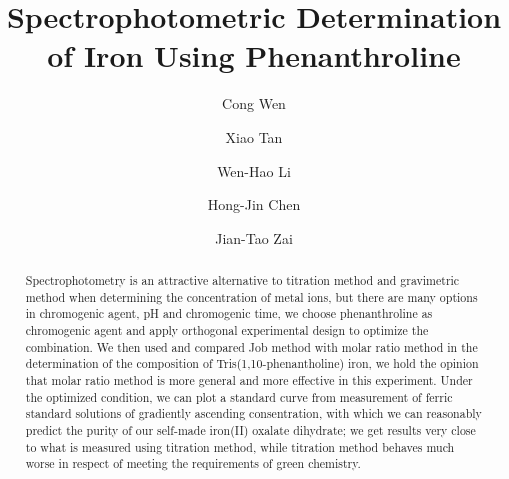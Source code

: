 \documentclass[journal=jacsat,manuscript=article]{achemso}
\author{Cong Wen}
\author{Xiao Tan}
\author{Wen-Hao Li}
\author{Hong-Jin Chen}
\author{Jian-Tao Zai}
\affiliation[SJTU]
    {School of Chemistry and Chemical Engineering, Shanghai Jiao Tong University, Shanghai 200240, P. R. China}
\title{Spectrophotometric Determination of Iron Using Phenanthroline}
\begin{document}

\begin{abstract}

\textsf{Spectrophotometry} is an attractive alternative to titration method and gravimetric method when determining the concentration of metal ions, but there are many options in chromogenic agent, pH and chromogenic time, we choose phenanthroline as chromogenic agent and apply \textsf{orthogonal experimental design} to optimize the combination. We then used and compared \textsf{Job method} with \textsf{molar ratio method} in the determination of the composition of Tris(1,10-phenantholine) iron, we hold the opinion that molar ratio method is more general and more effective in this experiment. Under the optimized condition, we can plot a standard curve from measurement of ferric standard solutions of gradiently ascending consentration, with which we can reasonably predict the purity of our self-made iron(II) oxalate dihydrate; we get results very close to what is measured using titration method, while titration method behaves much worse in respect of meeting the requirements of green chemistry.

\end{abstract}

\end{document}
